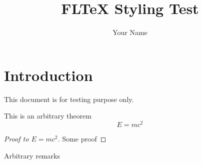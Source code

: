 \documentclass[10pt]{article}
\begin{document}
\title{FLTeX Styling Test}
\author{Your Name}
\maketitle
\newpage
\pagestyle{fancynotes}

\section{Introduction}
This document is for testing purpose only.

\begin{theorem}
  This is an arbitrary theorem
\begin{equation}
E = mc^2
\end{equation}
\end{theorem}
\begin{proof}[Proof to $E=mc^2$]
Some proof
\end{proof}
\begin{remark}
Arbitrary remarks
\end{remark}
\end{document}
